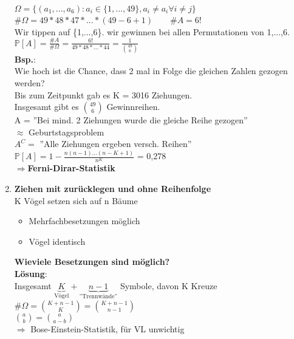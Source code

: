 \begin{enumerate}
	 $\Omega = \{(a_1,...,a_6):a_i \in \{1,...,49\},a_i \neq a_i \forall i \neq j\}$\smallskip\\
	 \#$\Omega = 49*48*47*...*(49-6+1) \qquad \#A = 6! $\medskip\\
	 Wir tippen auf \{1,...,6\}. wir gewinnen bei allen Permutationen von 1,...,6.\\
	 $\mathds{P}[A] = \frac{\#A}{\#\Omega}=\frac{6!}{49*48*...*44} = \frac{1}{\binom{49}{6}}$\medskip\\
	 \textbf{Bsp.}:\\ Wie hoch ist die Chance, dass 2 mal in Folge die gleichen Zahlen gezogen werden?\\
	 Bis zum Zeitpunkt gab es K = 3016 Ziehungen.\\
	 Insgesamt gibt es $\binom{49}{6}$ Gewinnreihen.\\
	 A = ''Bei mind. 2 Ziehungen wurde die gleiche Reihe gezogen''\\$\approx$ Geburtstagsproblem\\
	 $A^C = $ ''Alle Ziehungen ergeben versch. Reihen''\\
	 $\mathds{P}[A] = 1 - \frac{n(n-1)...(n-K+1)}{n^K}$ = 0,278\\
	 $\Rightarrow$\textbf{Ferni-Dirar-Statistik}
	\item \textbf{Ziehen mit zurücklegen und ohne Reihenfolge}\\
	K Vögel setzen sich auf n Bäume
\begin{itemize}
	\item 	Mehrfachbesetzungen möglich
	\item 	Vögel identisch
\end{itemize}
\textbf{Wieviele Besetzungen sind möglich?}\medskip\\
\textbf{Lösung}:\\
Insgesamt $\underbrace{K}_\text{Vögel}+\underbrace{n-1}_\text{''Trennwände''}$ Symbole, davon K Kreuze\medskip\\
\#$\Omega = \binom{K+n-1}{K} = \binom{K+n-1}{n-1} $\medskip\\
$\binom{a}{b} = \binom{a}{a-b}$\smallskip\\
$\Rightarrow$ Bose-Einstein-Statistik, für VL unwichtig
\end{enumerate}

